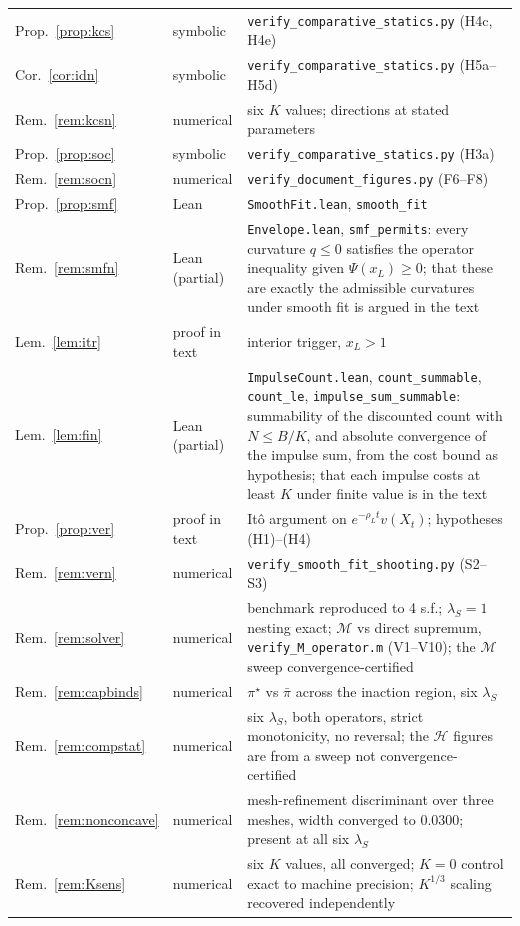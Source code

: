 \documentclass[11pt]{article}
\theoremstyle{remark}
\begin{document}
\begin{longtable}{p{} p{} p{}}
Prop.~\ref{prop:kcs} & symbolic &
\texttt{verify\_comparative\_statics.py} (H4c, H4e) \\
Cor.~\ref{cor:idn} & symbolic &
\texttt{verify\_comparative\_statics.py} (H5a--H5d) \\
Rem.~\ref{rem:kcsn} & numerical &
six $K$ values; directions at stated parameters \\
Prop.~\ref{prop:soc} & symbolic &
\texttt{verify\_comparative\_statics.py} (H3a) \\
Rem.~\ref{rem:socn} & numerical &
\texttt{verify\_document\_figures.py} (F6--F8) \\
Prop.~\ref{prop:smf} & Lean &
\texttt{SmoothFit.lean}, \texttt{smooth\_fit} \\
Rem.~\ref{rem:smfn} & Lean (partial) &
\texttt{Envelope.lean}, \texttt{smf\_permits}: every curvature
$q \le 0$ satisfies the operator inequality given
$\Psi(x_L) \ge 0$; that these are exactly the admissible curvatures
under smooth fit is argued in the text \\
Lem.~\ref{lem:itr} & proof in text &
interior trigger, $x_L > 1$ \\
Lem.~\ref{lem:fin} & Lean (partial) &
\texttt{ImpulseCount.lean}, \texttt{count\_summable},
\texttt{count\_le}, \texttt{impulse\_sum\_summable}: summability of the
discounted count with $N \le B/K$, and absolute convergence of the
impulse sum, from the cost bound as hypothesis; that each impulse costs
at least $K$ under finite value is in the text \\
Prop.~\ref{prop:ver} & proof in text &
It\^o argument on $e^{-\rho_L t}v(X_t)$; hypotheses (H1)--(H4) \\
Rem.~\ref{rem:vern} & numerical &
\texttt{verify\_smooth\_fit\_shooting.py} (S2--S3) \\
Rem.~\ref{rem:solver} & numerical &
benchmark reproduced to 4 s.f.; $\lambda_S=1$ nesting exact;
$\mathcal{M}$ vs direct supremum, \texttt{verify\_M\_operator.m}
(V1--V10); the $\mathcal{M}$ sweep convergence-certified \\
Rem.~\ref{rem:capbinds} & numerical &
$\pi^\star$ vs $\bar\pi$ across the inaction region, six $\lambda_S$ \\
Rem.~\ref{rem:compstat} & numerical &
six $\lambda_S$, both operators, strict monotonicity, no reversal; the
$\mathcal{H}$ figures are from a sweep not convergence-certified \\
Rem.~\ref{rem:nonconcave} & numerical &
mesh-refinement discriminant over three meshes, width converged to
$0.0300$; present at all six $\lambda_S$ \\
Rem.~\ref{rem:Ksens} & numerical &
six $K$ values, all converged; $K=0$ control exact to machine precision;
$K^{1/3}$ scaling recovered independently \\
\bottomrule
\end{longtable}
\end{document}
